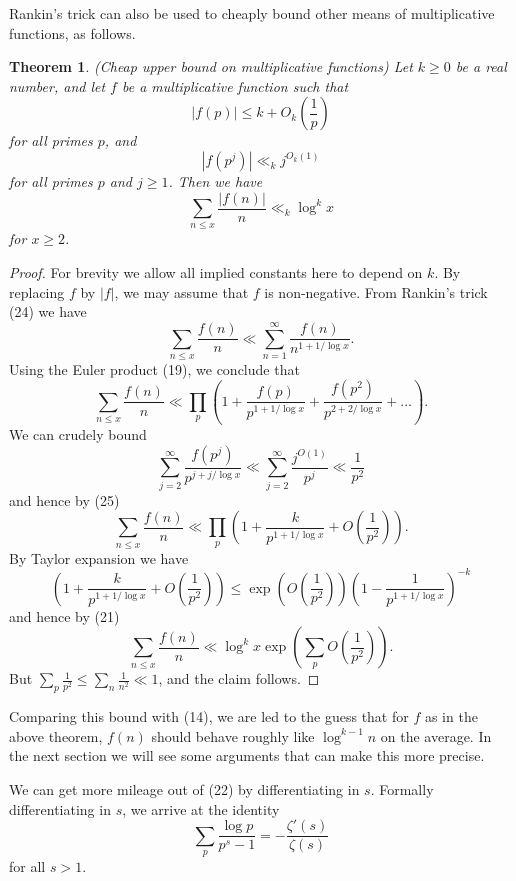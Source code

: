 \documentclass[10pt,reqno]{amsart}
\newtheorem{theorem}{Theorem}
\begin{document}
Rankin’s trick can also be used to cheaply bound other means of multiplicative functions, as follows.

\begin{theorem} (Cheap upper bound on multiplicative functions)
    Let $k \geq 0$ be a real number, and let $f$ be a multiplicative function such that
    \begin{equation}   |f(p)| \leq k + O_k \left( \frac{1}{p} \right) \end{equation}
    for all primes $p$, and
    \[  |f(p^j)| \ll_k j^{O_k(1)}\]
    for all primes $p$ and $j \geq 1$. Then we have
    \[  \sum_{n \leq x} \frac{|f(n)|}{n} \ll_k \log^k x\]
    for $x \geq 2$.
\end{theorem}
\begin{proof}
    For brevity we allow all implied constants here to depend on $k$. By replacing $f$ by $|f|$, we may assume that $f$ is non-negative. From Rankin’s trick (24) we have
    \[  \sum_{n \leq x} \frac{f(n)}{n} \ll \sum_{n=1}^\infty \frac{f(n)}{n^{1+1/\log x}}.\]
    Using the Euler product (19), we conclude that
    \[  \sum_{n \leq x} \frac{f(n)}{n} \ll \prod_p \left(1 + \frac{f(p)}{p^{1+1/\log x}} + \frac{f(p^2)}{p^{2+2/\log x}} + \dots \right).\]
    We can crudely bound
    \[  \sum_{j=2}^\infty \frac{f(p^j)}{p^{j+j/\log x}} \ll \sum_{j=2}^\infty \frac{j^{O(1)}}{p^j} \ll \frac{1}{p^2} \]
    and hence by (25)
    \[  \sum_{n \leq x} \frac{f(n)}{n} \ll \prod_p \left(1 + \frac{k}{p^{1+1/\log x}} + O \left(\frac{1}{p^2} \right) \right).\]
    By Taylor expansion we have
    \[  \left(1 + \frac{k}{p^{1+1/\log x}} + O \left(\frac{1}{p^2} \right) \right) \leq \exp \left( O \left(\frac{1}{p^2} \right) \right) \left(1 - \frac{1}{p^{1+1/\log x}} \right)^{-k}\]
    and hence by (21)
    \[  \sum_{n \leq x} \frac{f(n)}{n} \ll \log^k x \exp \left( \sum_p O \left( \frac{1}{p^2} \right) \right).\]
    But $\sum_p \frac{1}{p^2} \leq \sum_n \frac{1}{n^2} \ll 1$, and the claim follows. %
\end{proof}

Comparing this bound with (14), we are led to the guess that for $f$ as in the above theorem, $f(n)$ should behave roughly like $\log^{k-1} n$ on the average. In the next section we will see some arguments that can make this more precise.

We can get more mileage out of (22) by differentiating in $s$. Formally differentiating in $s$, we arrive at the identity
%
\begin{equation}   \sum_p \frac{\log p}{p^s - 1} = -\frac{\zeta'(s)}{\zeta(s)} \end{equation}
%
for all $s>1$.
\end{document}
